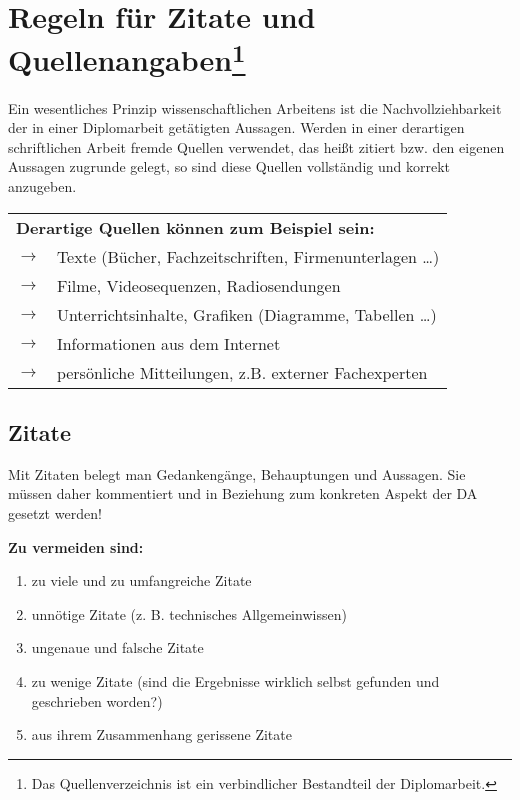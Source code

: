\documentclass[a4paper, 12pt, xcolor=dvipsnames]{scrartcl}		%
\begin{document}
\section{Regeln für Zitate und Quellenangaben\protect\footnote{Das Quellenverzeichnis ist ein verbindlicher Bestandteil der Diplomarbeit.}}
Ein wesentliches Prinzip wissenschaftlichen Arbeitens ist die Nachvollziehbarkeit der in einer Diplomarbeit
getätigten Aussagen. Werden in einer derartigen schriftlichen Arbeit fremde Quellen verwendet, das heißt zitiert bzw. den eigenen Aussagen zugrunde gelegt, so sind diese Quellen vollständig und korrekt anzugeben.\\

{\begin{tabular}{p{1.0cm}p{12.0cm}}
\multicolumn{2}{p{13.0cm}}{\textbf{Derartige Quellen können zum Beispiel sein:}} \\ 
\textcolor{black!80} {\large\textbf{$\to$}}  & Texte (Bücher, Fachzeitschriften, Firmenunterlagen \dots) \\ 
\textcolor{black!80} {\large\textbf{$\to$}}  & Filme, Videosequenzen, Radiosendungen \\
\textcolor{black!80} {\large\textbf{$\to$}}  & Unterrichtsinhalte, Grafiken (Diagramme, Tabellen \dots) \\
\textcolor{black!80} {\large\textbf{$\to$}}  & Informationen aus dem Internet \\
\textcolor{black!80} {\large\textbf{$\to$}}  & persönliche Mitteilungen, z.B. externer Fachexperten \\ 
\end{tabular}}
\vspace{0.5cm}
  

\subsection{Zitate}

%
\begin{Merksatz}
Mit Zitaten belegt man Gedankengänge, Behauptungen und Aussagen.
Sie müssen daher kommentiert und in Beziehung zum konkreten Aspekt der DA gesetzt
werden!
\end{Merksatz}
%

\textbf{Zu vermeiden sind:}
%
\begin{enumerate}
\linespread {1.0}
\item zu viele und zu umfangreiche Zitate
\item unnötige Zitate (z. B. technisches Allgemeinwissen)
\item ungenaue und falsche Zitate
\item zu wenige Zitate (sind die Ergebnisse wirklich selbst gefunden und geschrieben worden?)
\item aus ihrem Zusammenhang gerissene Zitate
\linespread {1.25}
\end{enumerate}
\end{document}
